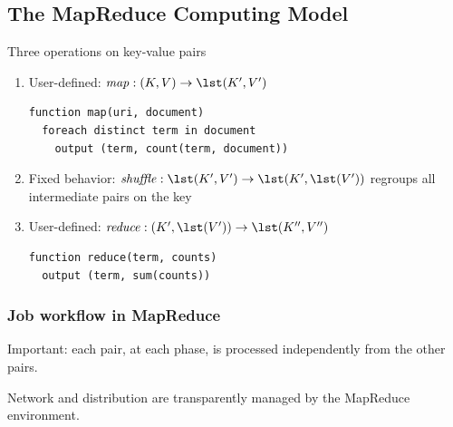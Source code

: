 \subsection{The MapReduce Computing Model}

\renewcommand{\map}{\mathop{\mathit{map}}}
\renewcommand{\reduce}{\mathop{\mathit{reduce}}}
\newcommand{\shuffle}{\mathop{\mathit{shuffle}}}
\newcommand{\combiner}{\mathop{\mathit{combiner}}}

\begin{frame}[fragile]{Three operations on key-value pairs}

\begin{enumerate}
\item User-defined: $\map: (K,V)\rightarrow \lst(K',V')$

\begin{lstlisting}[language=pseudo]
function map(uri, document)
  foreach distinct term in document
    output (term, count(term, document))
\end{lstlisting}

\item Fixed behavior:
$\shuffle: \lst(K',V')\rightarrow\lst(K',\lst(V'))$ regroups all intermediate
pairs on the key

  \item User-defined: $\reduce: (K',\lst(V'))\rightarrow \lst(K'',V'')$

\begin{lstlisting}[language=pseudo]
function reduce(term, counts)
  output (term, sum(counts))
\end{lstlisting}
\end{enumerate}

\end{frame}


\begin{frame}
\frametitle{Job workflow in MapReduce}

\alert{Important}: each pair, at each phase, is processed \alert{independently}
from the other pairs.


Network and distribution are transparently managed by the MapReduce
environment.
\end{frame}

